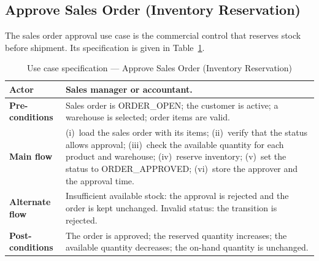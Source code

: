 \subsection{Approve Sales Order (Inventory Reservation)}
The sales order approval use case is the commercial control that reserves stock
before shipment. Its specification is given in Table~\ref{tab:uc-so}.
\begin{table}[H]\centering
\caption{Use case specification --- Approve Sales Order (Inventory Reservation)}
\label{tab:uc-so}
\begin{tabular}{|p{3cm}|p{11cm}|}
\hline
\textbf{Actor} & Sales manager or accountant. \\ \hline
\textbf{Pre-conditions} & Sales order is ORDER\_OPEN; the customer is active; a warehouse is selected; order items are valid. \\ \hline
\textbf{Main flow} & (i)~load the sales order with its items; (ii)~verify that the status allows approval; (iii)~check the available quantity for each product and warehouse; (iv)~reserve inventory; (v)~set the status to ORDER\_APPROVED; (vi)~store the approver and the approval time. \\ \hline
\textbf{Alternate flow} & Insufficient available stock: the approval is rejected and the order is kept unchanged. Invalid status: the transition is rejected. \\ \hline
\textbf{Post-conditions} & The order is approved; the reserved quantity increases; the available quantity decreases; the on-hand quantity is unchanged. \\ \hline
\end{tabular}
\end{table}

